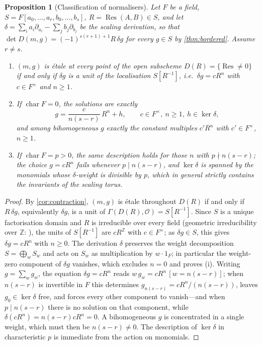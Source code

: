 \documentclass[11pt,reqno]{amsart}
\newtheorem{proposition}[proposition]{Proposition}
\theoremstyle{definition}
\theoremstyle{remark}
\newcommand{\Z}{\mathbb Z}
\newcommand{\OO}{\mathcal O}
\newcommand{\Res}{\operatorname{Res}}
\begin{document}
\begin{proposition}[Classification of normalisers]
\label{prop:normalisers}
Let $F$ be a field, $S=F[a_0,\dots,a_r,b_0,\dots,b_s]$,
$R=\Res(A,B)\in S$, and let
$\delta=\sum_ia_i\partial_{a_i}-\sum_jb_j\partial_{b_j}$ be the
scaling derivation, so that
$\det D(m,g)=(-1)^{s(r+1)+1}R\,\delta g$ for every $g\in S$ by
\cref{thm:bordered}.  Assume $r\ne s$.
\begin{enumerate}[leftmargin=2.2em,label=\textup{(\roman*)}]
\item $(m,g)$ is \'etale at every point of the open subscheme
$D(R)=\{\Res\ne0\}$ if and only if $\delta g$ is a unit of the
localisation $S[R^{-1}]$, i.e.\ $\delta g=cR^n$ with
$c\in F^\times$ and $n\ge1$.
\item If $\operatorname{char}F=0$, the solutions are exactly
\[
 g=\frac{c}{n(s-r)}\,R^n+h,
 \qquad c\in F^\times,\ n\ge1,\ h\in\ker\delta,
\]
and among bihomogeneous $g$ exactly the constant multiples
$c'R^n$ with $c'\in F^\times$, $n\ge1$.
\item If $\operatorname{char}F=p>0$, the same description holds for
those $n$ with $p\nmid n(s-r)$; the choice $g=cR^n$ fails whenever
$p\mid n(s-r)$, and $\ker\delta$ is spanned by the monomials whose
$\delta$-weight is divisible by $p$, which in general strictly
contains the invariants of the scaling torus.
\end{enumerate}
\end{proposition}

\begin{proof}
By \cref{cor:contraction}, $(m,g)$ is \'etale throughout
$D(R)$ if and only if $R\,\delta g$, equivalently $\delta g$, is a
unit of $\Gamma(D(R),\OO)=S[R^{-1}]$.  Since $S$ is a unique
factorisation domain and $R$ is irreducible over every field
(geometric irreducibility over $\Z$: \cite[2.3(iii)]{Jouanolou1991}),
the units of $S[R^{-1}]$ are $cR^{\Z}$ with $c\in F^\times$; as
$\delta g\in S$, this gives $\delta g=cR^n$ with $n\ge0$.  The
derivation $\delta$ preserves the weight decomposition
$S=\bigoplus_wS_w$ and acts on $S_w$ as multiplication by
$w\cdot1_F$; in particular the weight-zero component of
$\delta g$ vanishes, which excludes $n=0$ and proves (i).  Writing
$g=\sum_wg_w$, the equation $\delta g=cR^n$ reads
$w\,g_w=cR^n\,[w=n(s-r)]$; when $n(s-r)$ is invertible in
$F$ this determines $g_{n(s-r)}=cR^n/(n(s-r))$, leaves
$g_0\in\ker\delta$ free, and forces every other component to
vanish---and when $p\mid n(s-r)$ there is no solution on that
component, while $\delta(cR^n)=n(s-r)cR^n=0$.  A bihomogeneous
$g$ is concentrated in a single weight, which must then be
$n(s-r)\ne0$.  The description of $\ker\delta$ in characteristic
$p$ is immediate from the action on monomials.
\end{proof}
\end{document}

